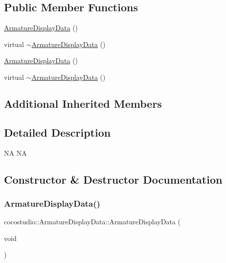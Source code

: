 \subsection*{Public Member Functions}
\begin{DoxyCompactItemize}
\item 
\hyperlink{classcocostudio_1_1ArmatureDisplayData_a3c96c3db7a929f3c7fabc2199d5ec001}{Armature\+Display\+Data} ()
\item 
virtual \hyperlink{classcocostudio_1_1ArmatureDisplayData_a7371acfd9cdec9d53cecf554da47bf58}{$\sim$\+Armature\+Display\+Data} ()
\item 
\hyperlink{classcocostudio_1_1ArmatureDisplayData_a3c96c3db7a929f3c7fabc2199d5ec001}{Armature\+Display\+Data} ()
\item 
virtual \hyperlink{classcocostudio_1_1ArmatureDisplayData_a7371acfd9cdec9d53cecf554da47bf58}{$\sim$\+Armature\+Display\+Data} ()
\end{DoxyCompactItemize}
\subsection*{Additional Inherited Members}


\subsection{Detailed Description}
NA  NA 

\subsection{Constructor \& Destructor Documentation}
\mbox{\label{classcocostudio_1_1ArmatureDisplayData_a3c96c3db7a929f3c7fabc2199d5ec001}} 
\subsubsection{\texorpdfstring{Armature\+Display\+Data()}{ArmatureDisplayData()}\hspace{0.1cm}{\footnotesize\ttfamily [1/2]}}
{\footnotesize\ttfamily cocostudio\+::\+Armature\+Display\+Data\+::\+Armature\+Display\+Data (\begin{DoxyParamCaption}\item[{void}]{ }\end{DoxyParamCaption})}

